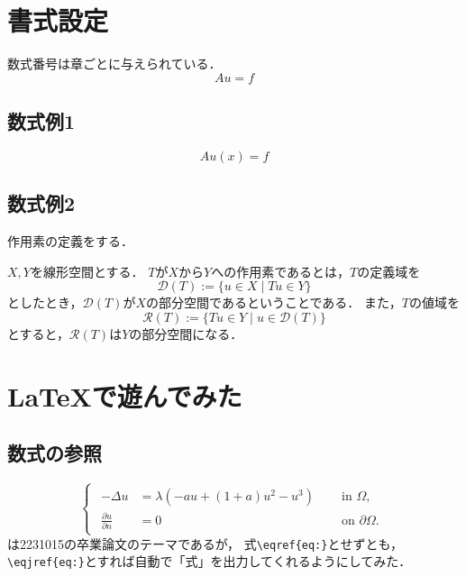 \section{書式設定}
数式番号は章ごとに与えられている．
\begin{equation}
    Au = f
\end{equation}

\subsection{数式例1}
\begin{equation}
    Au(x) = f
\end{equation}

\subsection{数式例2}
作用素の定義をする\cite[p.103]{FujitaAnalysis2020}．
\begin{Def}[作用素]
    $X, Y$を線形空間とする．
    $T$が$X$から$Y$への作用素であるとは，$T$の定義域を
    \begin{equation}
        \mathcal{D}(T) := \{ u \in X \mid Tu \in Y \} 
    \end{equation}
    としたとき，$\mathcal{D}(T)$が$X$の部分空間であるということである．
    また，$T$の値域を
    \begin{equation}
        \mathcal{R}(T) := \{ Tu \in Y \mid u \in \mathcal{D}(T) \} 
    \end{equation}
    とすると，$\mathcal{R}(T)$は$Y$の部分空間になる．
\end{Def}

\section{LaTeXで遊んでみた}
\subsection{数式の参照}
\begin{equation}\label{eq:neumann_nagumo_problem}
  \begin{cases}
    \begin{alignedat}{2}
      -\Delta u &= \lambda (-au + (1+a)u^2 - u^3) &\ & \text{ in } \Omega, \\
      \frac{\partial u}{\partial n} &= 0 &\ & \text{ on } \partial \Omega.
    \end{alignedat}
  \end{cases}
\end{equation}
は2231015の卒業論文のテーマであるが，
式\verb*|\eqref{eq:}|とせずとも，\verb*|\eqjref{eq:}|とすれば自動で「式」を出力してくれるようにしてみた．


